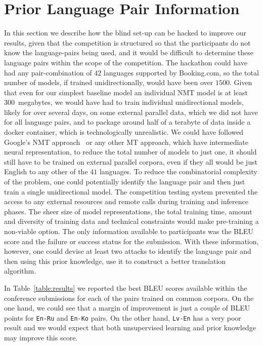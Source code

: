 \documentclass[]{article}
\begin{document}
\section{Prior Language Pair Information}
\label{sect:non_blind}

In this section we describe how the blind set-up can be hacked to improve our results, given that the competition is structured so that the participants do not know the language-pairs being used, and it would be difficult to determine these language pairs within the scope of the competition.
The hackathon could have had any pair-combination of $42$ languages supported by {{Booking.com}}, so the total number of models, if trained unidirectionally, would have been over $1500$.
Given that even for our simplest baseline model an individual \ac{NMT} model is at least $300$~megabytes, we would have had to train individual unidirectional models, likely for over several days, on some external parallel data, which we did not have for all language pairs, and to package around half of a terabyte of data inside a docker container, which is technologically unrealistic.
We could have followed Google's \ac{NMT} approach~\citep{johnson2017google} or any other \ac{MT} approach, which have intermediate neural representation, to reduce the total number of models to just one, it should still have to be trained on external parallel corpora, even if they all would be just English to any other of the $41$ languages.
To reduce the combinatorial complexity of the problem, one could potentially identify the language pair and then just train a single unidirectional model.
The competition testing system prevented the access to any external resources and remote calls during training and inference phases.
The sheer size of model representations, the total training time, amount and diversity of training data and technical constraints would make pre-training a non-viable option.
The only information available to participants was the BLEU score and the failure or success status for the submission.
With these information, however, one could devise at least two attacks to identify the language pair and then using this prior knowledge, use it to construct a better translation algorithm.

In Table~\ref{table:results} we reported the best BLEU scores available within the conference submissions for each of the pairs trained on common corpora.
On the one hand, we could see that a margin of improvement is just a couple of BLEU points for {\tt En-Ru} and {\tt En-Ko} pairs.
On the other hand, {\tt Lv-En} has a very poor result and we would expect that both unsupervised learning and prior knowledge may improve this score.
\end{document}
